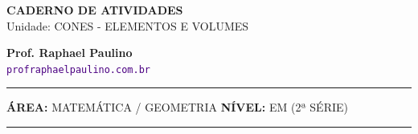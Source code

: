 \documentclass[twoside, 10pt, a4paper]{article}
\begin{document}
\thispagestyle{empty}
\color{Cinzablack}
\vspace*{-1.8cm}

\noindent
\begin{minipage}{\textwidth}
    \selectfont
    \noindent
    \begin{minipage}[t]{0.70\linewidth}
        {\Large \bfseries \MakeUppercase{Caderno de Atividades}}\\[0.1cm]
        {\large \textmd{\textcolor{CinzaEscuro}{Unidade: CONES - ELEMENTOS E VOLUMES}}}
    \end{minipage}%
    \begin{minipage}[t]{0.30\linewidth}
        \raggedleft
        \small \textbf{Prof. Raphael Paulino}\\
        \textsf{\small \textcolor{indigo}{\texttt{profraphaelpaulino.com.br}}}
    \end{minipage}
    
    \vspace{0.15cm}
    \noindent\rule{\linewidth}{1.2pt}
    \vspace{-0.1cm}
    \footnotesize\textsf{\textbf{ÁREA:} MATEMÁTICA / GEOMETRIA \hfill \textbf{NÍVEL:} EM (2ª SÉRIE)}
    \vspace{0.1cm}
    \noindent\rule{\linewidth}{0.4pt}
\end{minipage}
\end{document}
